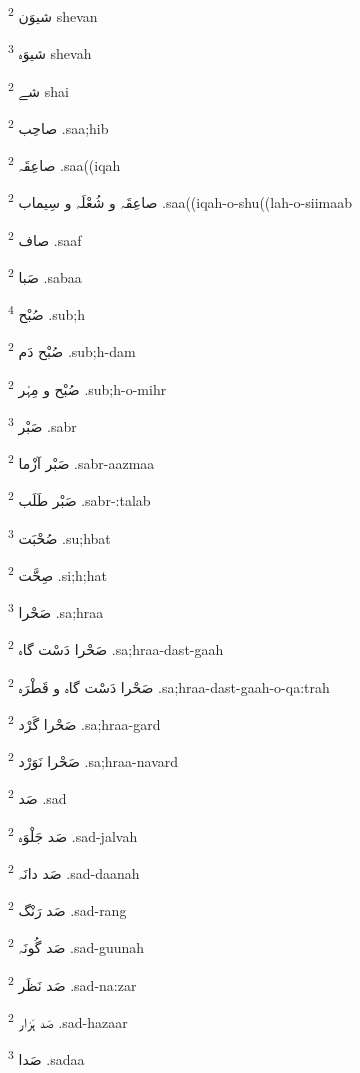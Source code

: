 \documentclass[12pt]{article}
\begin{document}
\begin{multicols}{5}
{\ur شیوَن}   \textsuperscript{2} shevan

{\ur شیوَہ}   \textsuperscript{3} shevah

{\ur شے}   \textsuperscript{2} shai

{\ur صاحِب}   \textsuperscript{2} .saa;hib

{\ur صاعِقَہ}   \textsuperscript{2} .saa((iqah

{\ur صاعِقَہ و شُعْلَہ و سِیماب}   \textsuperscript{2} .saa((iqah-o-shu((lah-o-siimaab

{\ur صاف}   \textsuperscript{2} .saaf

{\ur صَبا}   \textsuperscript{2} .sabaa

{\ur صُبْح}   \textsuperscript{4} .sub;h

{\ur صُبْح دَم}   \textsuperscript{2} .sub;h-dam

{\ur صُبْح و مِہْر}   \textsuperscript{2} .sub;h-o-mihr

{\ur صَبْر}   \textsuperscript{3} .sabr

{\ur صَبْر آزْما}   \textsuperscript{2} .sabr-aazmaa

{\ur صَبْر طَلَب}   \textsuperscript{2} .sabr-:talab

{\ur صُحْبَت}   \textsuperscript{3} .su;hbat

{\ur صِحَّت}   \textsuperscript{2} .si;h;hat

{\ur صَحْرا}   \textsuperscript{3} .sa;hraa

{\ur صَحْرا دَسْت گاہ}   \textsuperscript{2} .sa;hraa-dast-gaah

{\ur صَحْرا دَسْت گاہ و قَطْرَہ}   \textsuperscript{2} .sa;hraa-dast-gaah-o-qa:trah

{\ur صَحْرا گَرْد}   \textsuperscript{2} .sa;hraa-gard

{\ur صَحْرا نَوَرْد}   \textsuperscript{2} .sa;hraa-navard

{\ur صَد}   \textsuperscript{2} .sad

{\ur صَد جَلْوَہ}   \textsuperscript{2} .sad-jalvah

{\ur صَد دانَہ}   \textsuperscript{2} .sad-daanah

{\ur صَد رَنْگ}   \textsuperscript{2} .sad-rang

{\ur صَد گُونَہ}   \textsuperscript{2} .sad-guunah

{\ur صَد نَظَر}   \textsuperscript{2} .sad-na:zar

{\ur صَد ہَزار}   \textsuperscript{2} .sad-hazaar

{\ur صَدا}   \textsuperscript{3} .sadaa


\end{multicols}
\end{document}

